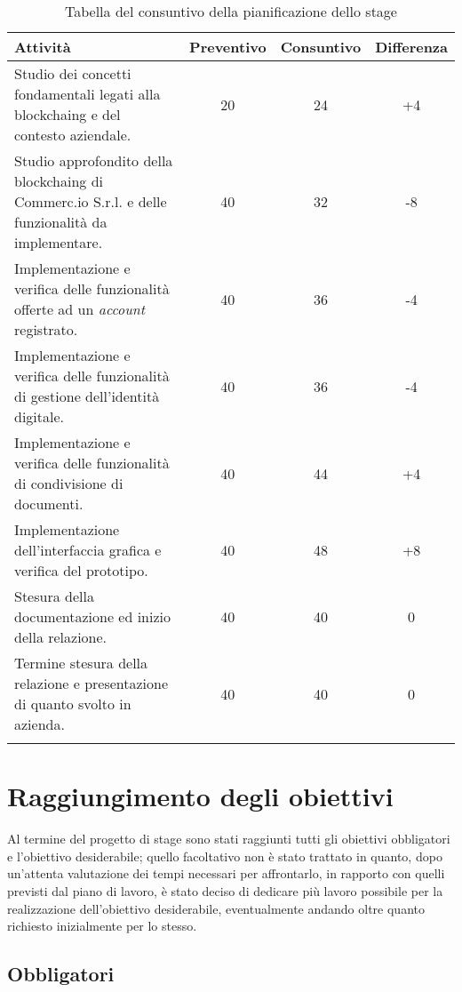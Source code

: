\begin{longtable}{|p{5.6cm}|c|c|c|}
	\hline
	\rowcolor{gray}
	\textbf{Attività} & \textbf{Preventivo} & \textbf{Consuntivo} & \textbf{Differenza} \\\hline
	Studio dei concetti fondamentali legati alla \gls{blockchaing} e del contesto aziendale. & 20 & 24 & +4 \\\hline
	Studio approfondito della \gls{blockchaing} di Commerc.io S.r.l. e delle funzionalità da implementare. & 40 & 32 & -8 \\\hline
	Implementazione e verifica delle funzionalità offerte ad un \textit{account} registrato. & 40 & 36 & -4 \\\hline
	Implementazione e verifica delle funzionalità di gestione dell'identità digitale. & 40 & 36 & -4 \\\hline
	Implementazione e verifica delle funzionalità di condivisione di documenti. & 40 & 44 & +4 \\\hline
	Implementazione dell'interfaccia grafica e verifica del prototipo. & 40 & 48 & +8 \\\hline
	Stesura della documentazione ed inizio della relazione. & 40 & 40 & 0 \\\hline
	Termine stesura della relazione e presentazione di quanto svolto in azienda. & 40 & 40 & 0 \\\hline
	
	\caption{Tabella del consuntivo della pianificazione dello stage}
	\label{tab:rendiconto}
\end{longtable}

\section{Raggiungimento degli obiettivi}

Al termine del progetto di stage sono stati raggiunti tutti gli obiettivi obbligatori e l'obiettivo desiderabile; quello facoltativo non è stato trattato in quanto, dopo un'attenta valutazione dei tempi necessari per affrontarlo, in rapporto con quelli previsti dal piano di lavoro, è stato deciso di dedicare più lavoro possibile per la realizzazione dell'obiettivo desiderabile, eventualmente andando oltre quanto richiesto inizialmente per lo stesso.

\subsection{Obbligatori}

